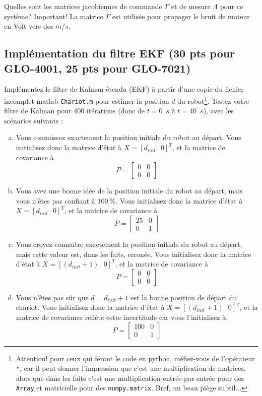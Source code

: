\documentclass[12pt]{article}
\begin{document}
Quelles sont les matrices jacobiennes de commande $\Gamma$ et de mesure $\Lambda$ pour ce système? Important! La matrice $\Gamma$ est utilisée pour propager le bruit de moteur en Volt vers des $m/s$.

\subsection{Implémentation du filtre EKF (30 pts pour GLO-4001, 25 pts pour GLO-7021)}
Implémentez le filtre de Kalman étendu (EKF) à partir d'une copie du fichier incomplet matlab \texttt{Chariot.m} pour estimer la position $d$ du robot\footnote{Attention! pour ceux qui feront le code en python, méfiez-vous de l'opérateur \texttt{*}, car il peut donner l'impression que c'est une multiplication de matrices, alors que dans les faits c'est une multiplication entrée-par-entrée pour des \texttt{Array} et matricielle pour des \texttt{numpy.matrix}. Bref, un beau piège subtil...}. Testez votre filtre de Kalman pour 400 itérations (donc de $t=0$~$s$ à $t=40$~$s$), avec les scénarios suivants :
\begin{enumerate}[a)]
\item Vous connaissez exactement la position initiale du robot au départ. Vous initialisez donc la matrice d'état à $X=[d_{init} \mbox{ }0]^T$, et la matrice de covariance à
$$
P=
\begin{bmatrix}
0 &0\\
0 & 0
\end{bmatrix}
$$

\item Vous avez une bonne idée de la position initiale du robot au départ, mais vous n'êtes pas confiant à $100~\%$. Vous initialisez donc la matrice d'état à $X=[d_{init} \mbox{ }0]^T$, et la matrice de covariance à
$$
P=
\begin{bmatrix}
25 &0\\
0 & 1
\end{bmatrix}
$$

\item Vous croyez connaitre exactement la position initiale du robot au départ, mais cette valeur est, dans les faits, erronée. Vous initialisez donc la matrice d'état à $X=[(d_{init}+1) \mbox{  } 0]^T$, et la matrice de covariance à
$$
P=
\begin{bmatrix}
0 &0\\
0 & 0
\end{bmatrix}
$$

\item Vous n'êtes pas sûr que $d=d_{init}+1$ est la bonne position de départ du chariot. Vous initialisez donc la matrice d'état à $X=[(d_{init}+1)  \mbox{  }  0]^T$, et la matrice de covariance reflète cette incertitude car vous l'initialisez à:
$$
P=
\begin{bmatrix}
100 &0\\
0 & 1
\end{bmatrix}
$$

\end{enumerate}
\end{document}
